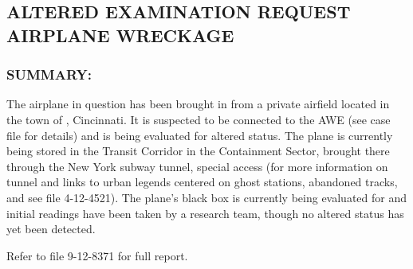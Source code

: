 \subsection*{ALTERED EXAMINATION REQUEST\\
	AIRPLANE WRECKAGE}
\subsubsection*{SUMMARY:}
\par The airplane in question has been brought in from a private airfield
located in the town of , Cincinnati. It is suspected to be connected to the  AWE (see case file
for details) and is being evaluated for altered
status. The plane is currently being stored in the Transit Corridor
in the Containment Sector, brought there through the New York
subway tunnel, special access  (for more
information on tunnel  and links to urban legends
centered on ghost stations, abandoned tracks, and 
see file 4-12-4521). The plane's black box is currently being
evaluated for  
and initial
readings have been taken by a research team, though no altered
status has yet been detected.
\par Refer to file 9-12-8371 for full report.